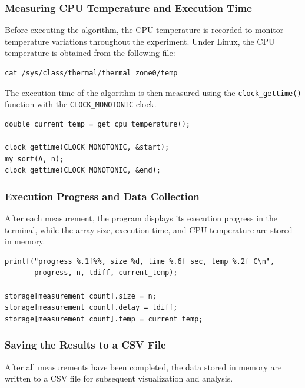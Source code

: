 \documentclass{article}
\begin{document}
\subsubsection{Measuring CPU Temperature and Execution Time}

Before executing the algorithm, the CPU temperature is recorded to monitor temperature variations throughout the experiment. Under Linux, the CPU temperature is obtained from the following file:

\begin{verbatim}
cat /sys/class/thermal/thermal_zone0/temp
\end{verbatim}

The execution time of the algorithm is then measured using the \texttt{clock\_gettime()} function with the \texttt{CLOCK\_MONOTONIC} clock.

\begin{verbatim}
double current_temp = get_cpu_temperature();

clock_gettime(CLOCK_MONOTONIC, &start);
my_sort(A, n);
clock_gettime(CLOCK_MONOTONIC, &end);
\end{verbatim}

\subsubsection{Execution Progress and Data Collection}

After each measurement, the program displays its execution progress in the terminal, while the array size, execution time, and CPU temperature are stored in memory.

\begin{verbatim}
printf("progress %.1f%%, size %d, time %.6f sec, temp %.2f C\n",
       progress, n, tdiff, current_temp);

storage[measurement_count].size = n;
storage[measurement_count].delay = tdiff;
storage[measurement_count].temp = current_temp;
\end{verbatim}

\subsubsection{Saving the Results to a CSV File}

After all measurements have been completed, the data stored in memory are written to a CSV file for subsequent visualization and analysis.
\end{document}

